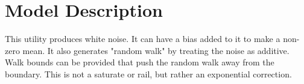 \section{Model Description}

This utility produces white noise. It can have a bias added to it to make a non-zero mean. It also generates "random walk" by treating the noise as additive. Walk bounds can be provided that push the random walk away from the boundary. This is not a saturate or rail, but rather an exponential correction.
